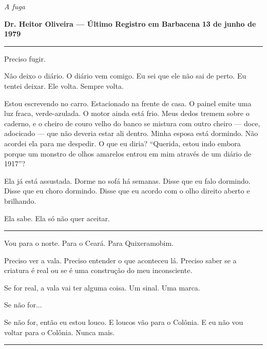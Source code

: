 
\noindent \textit{A fuga}

\noindent \textbf{Dr. Heitor Oliveira --- Último Registro em Barbacena}
\textbf{13 de junho de 1979}

\vspace{0.5em}\noindent\rule{\textwidth}{0.5pt}\vspace{0.5em}

\noindent Preciso fugir.

\noindent Não deixo o diário. O diário vem comigo. Eu sei que ele não sai de perto. Eu tentei deixar. Ele volta. Sempre volta.

\noindent Estou escrevendo no carro. Estacionado na frente de casa. O painel emite uma luz fraca, verde-azulada. O motor ainda está frio. Meus dedos tremem sobre o caderno, e o cheiro de couro velho do banco se mistura com outro cheiro --- doce, adocicado --- que não deveria estar ali dentro. Minha esposa está dormindo. Não acordei ela para me despedir. O que eu diria? \textquotedblleft{}Querida, estou indo embora porque um monstro de olhos amarelos entrou em mim através de um diário de 1917\textquotedblright{}?

\noindent Ela já está assustada. Dorme no sofá há semanas. Disse que eu falo dormindo. Disse que eu choro dormindo. Disse que eu acordo com o olho direito aberto e brilhando.

\noindent Ela sabe.
Ela só não quer aceitar.

\vspace{0.5em}\noindent\rule{\textwidth}{0.5pt}\vspace{0.5em}

\noindent Vou para o norte. Para o Ceará. Para Quixeramobim.

\noindent Preciso ver a vala. Preciso entender o que aconteceu lá. Preciso saber se a criatura é real ou se é uma construção do meu inconsciente.

\noindent Se for real, a vala vai ter alguma coisa. Um sinal. Uma marca.

\noindent Se não for...

\noindent Se não for, então eu estou louco. E loucos vão para o Colônia. E eu não vou voltar para o Colônia. Nunca mais.

\vspace{0.5em}\noindent\rule{\textwidth}{0.5pt}\vspace{0.5em}

